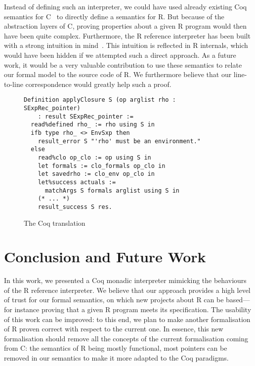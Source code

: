 \documentclass[9pt, sigplan, natbib=false, screen=true]{acmart}
\newcommand\Coq{Coq}
\newcommand\R{R}
\newcommand\Cn{C}
\begin{document}
Instead of defining such an interpreter,
we could have used already existing \Coq{} semantics
for \Cn{}~\parencite{formalin, Leroy-Compcert-CACM}
to directly define a semantics for \R{}.
But because of the abstraction layers of \Cn{},
proving properties about a given \R{} program
would then have been quite complex.
Furthermore, the \R{} reference interpreter has been built
with a strong intuition in mind~\parencite{ihaka1996r}.
This intuition is reflected in \R{} internals,
which would have been hidden if we attempted such a direct approach.
%
As a future work, it would be a very valuable contribution
to use these semantics to relate
our formal model to the source code of \R{}.
We furthermore believe that our line-to-line correspondence
would greatly help such a proof.

\begin{figure}
\begin{verbatim}
Definition applyClosure S (op arglist rho : SExpRec_pointer)
    : result SExpRec_pointer :=
  read%defined rho_ := rho using S in
  ifb type rho_ <> EnvSxp then
    result_error S "'rho' must be an environment."
  else
    read%clo op_clo := op using S in
    let formals := clo_formals op_clo in
    let savedrho := clo_env op_clo in
    let%success actuals :=
      matchArgs S formals arglist using S in
    (* ... *)
    result_success S res.
\end{verbatim}
    \caption{The \Coq{} translation}
    \label{fig:coq}
\end{figure}


\section{Conclusion and Future Work}
\label{sec:conclusion}

In this work, we presented a \Coq{} monadic interpreter
mimicking the behaviours of the \R{} reference interpreter.
We believe that our approach provides a high level of trust
for our formal semantics,
on which new projects about \R{} can be based---%
for instance
proving that a given \R{} program meets its specification.
The usability of this work can be improved:
to this end, we plan to make another formalisation
of \R{} proven correct with respect to the current one.
In essence, this new formalisation should
remove all the concepts of the current formalisation coming from \Cn{}:
the semantics of \R{} being mostly functional,
most pointers can be removed in our semantics
to make it more adapted to the \Coq{} paradigms.

%
%
%
%


\printbibliography
\end{document}
